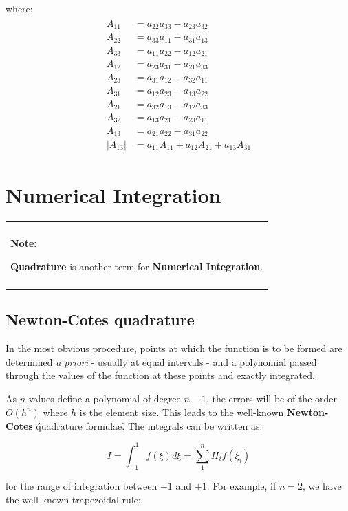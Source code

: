 \documentclass[10pt,b5paper,titlepage]{book}
\newenvironment{bbox}[1][0.96]
{
    \begin{center}
        \begin{tabular}{|p{#1\textwidth}|}
            \hline\\
}
{
            \\\\\hline
        \end{tabular}
    \end{center}
}
\newenvironment{eqarray}
{
    \begin{eqnarray}
        \begin{aligned}
}
{
        \end{aligned}
    \end{eqnarray}
}
\begin{document}
where:
\begin{eqarray}
    A_{11} &= a_{22} a_{33} - a_{23} a_{32}\\
    A_{22} &= a_{33} a_{11} - a_{31} a_{13}\\
    A_{33} &= a_{11} a_{22} - a_{12} a_{21}\\
    A_{12} &= a_{23} a_{31} - a_{21} a_{33}\\
    A_{23} &= a_{31} a_{12} - a_{32} a_{11}\\
    A_{31} &= a_{12} a_{23} - a_{13} a_{22}\\
    A_{21} &= a_{32} a_{13} - a_{12} a_{33}\\
    A_{32} &= a_{13} a_{21} - a_{23} a_{11}\\
    A_{13} &= a_{21} a_{22} - a_{31} a_{22}\\
    \vert A_{13} \vert &= a_{11} A_{11} + a_{12} A_{21} + a_{13} A_{31}
\end{eqarray}


\section{Numerical Integration}

\begin{bbox}
    \textbf{Note:}

    \textbf{Quadrature} is another term for \textbf{Numerical Integration}.
\end{bbox}


\subsection{Newton-Cotes quadrature}
In the most obvious procedure, points at which the function is to be formed are
determined \textit{a priori} - usually at equal intervals - and a polynomial
passed through the values of the function at these points and exactly integrated.

As $ n $ values define a polynomial of degree $ n - 1 $, the errors will be
of the order $ O(h^n) $ where $ h $ is the element size. This leads to the
well-known \textbf{Newton-Cotes} \'quadrature formulae\'. The integrals can be
written as:

\begin{equation}
    I = \int_{-1}^{1} f(\xi) d\xi = \sum_1^n H_i f(\xi_i)
\end{equation}

for the range of integration between $ -1 $ and $ +1 $. For example, if $ n = 2 $,
we have the well-known trapezoidal rule:
\end{document}
